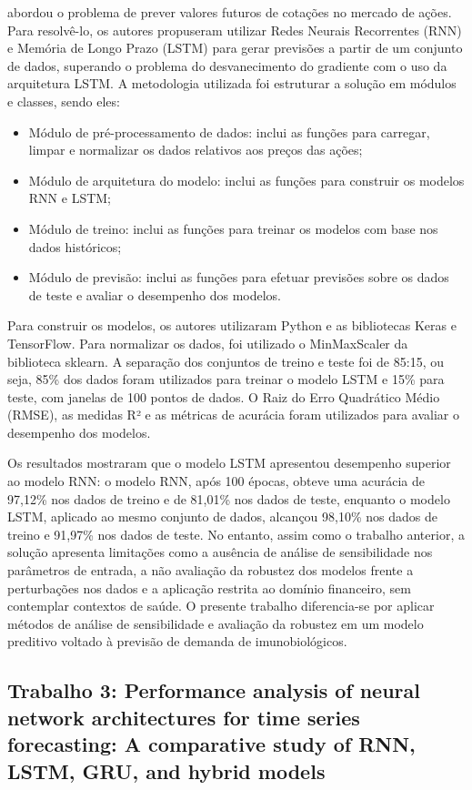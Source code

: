 \documentclass[
    12pt,                %
    openright,           %
    oneside,             %
    a4paper,             %
    english,             %
    brazil               %
]{abntex2}
\begin{document}
 abordou o problema de prever valores futuros de cotações no mercado de ações. Para resolvê-lo, os autores propuseram utilizar Redes Neurais Recorrentes (RNN) e Memória de Longo Prazo (LSTM) para gerar previsões a partir de um conjunto de dados, superando o problema do desvanecimento do gradiente com o uso da arquitetura LSTM. A metodologia utilizada foi estruturar a solução em módulos e classes, sendo eles:
\begin{itemize}
\item Módulo de pré-processamento de dados: inclui as funções para carregar, limpar e normalizar os dados relativos aos preços das ações;
\item Módulo de arquitetura do modelo: inclui as funções para construir os modelos RNN e LSTM;
\item Módulo de treino: inclui as funções para treinar os modelos com base nos dados históricos;
\item Módulo de previsão: inclui as funções para efetuar previsões sobre os dados de teste e avaliar o desempenho dos modelos.
\end{itemize}
Para construir os modelos, os autores utilizaram Python e as bibliotecas Keras e TensorFlow. Para normalizar os dados, foi utilizado o MinMaxScaler da biblioteca sklearn. A separação dos conjuntos de treino e teste foi de 85:15, ou seja, 85\% dos dados foram utilizados para treinar o modelo LSTM e 15\% para teste, com janelas de 100 pontos de dados. O Raiz do Erro Quadrático Médio (RMSE), as medidas R² e as métricas de acurácia foram utilizados para avaliar o desempenho dos modelos.

Os resultados mostraram que o modelo LSTM apresentou desempenho superior ao modelo RNN: o modelo RNN, após 100 épocas, obteve uma acurácia de 97,12\% nos dados de treino e de 81,01\% nos dados de teste, enquanto o modelo LSTM, aplicado ao mesmo conjunto de dados, alcançou 98,10\% nos dados de treino e 91,97\% nos dados de teste. No entanto, assim como o trabalho anterior, a solução apresenta limitações como a ausência de análise de sensibilidade nos parâmetros de entrada, a não avaliação da robustez dos modelos frente a perturbações nos dados e a aplicação restrita ao domínio financeiro, sem contemplar contextos de saúde. O presente trabalho diferencia-se por aplicar métodos de análise de sensibilidade e avaliação da robustez em um modelo preditivo voltado à previsão de demanda de imunobiológicos.

\subsection{Trabalho 3: Performance analysis of neural network architectures for time series forecasting: A comparative study of RNN, LSTM, GRU, and hybrid models}
\end{document}
